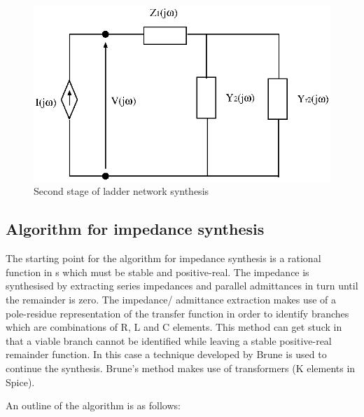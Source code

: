 \begin{figure}[ht]
\centering
\includegraphics[scale=0.7]{./Imgs/cauer_3.eps}
\caption{Second stage of ladder network synthesis}
\label{cauer_3}
\end{figure}
%

\subsection{Algorithm for impedance synthesis} 

The starting point for the algorithm for impedance synthesis is a rational function in s which must be stable and positive-real. The impedance is synthesised by extracting series impedances and parallel admittances in turn until the remainder is zero. The impedance/ admittance extraction makes use of a pole-residue representation of the transfer function in order to identify branches which are combinations of R, L and C elements. This method can get stuck in that a viable branch cannot be identified while leaving a stable positive-real remainder function. In this case a technique developed by Brune \cite{Brune} is used to continue the synthesis. Brune's method makes use of transformers (K elements in Spice).  

An outline of the algorithm is as follows:

